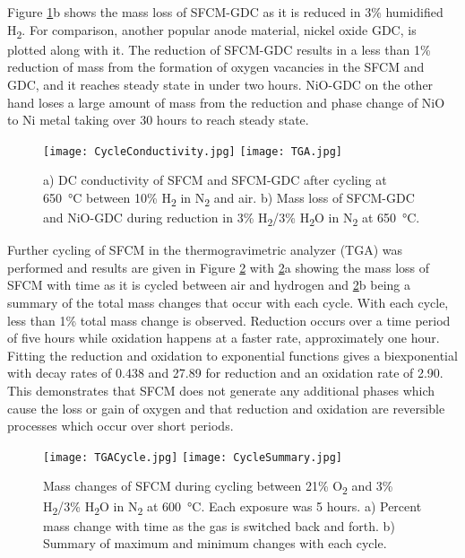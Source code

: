         Figure \ref{fig:TGA}b shows the mass loss of SFCM-GDC as it is reduced in 3\% humidified H\textsubscript{2}.
        For comparison, another popular anode material, nickel oxide GDC, is plotted along with it.
        The reduction of SFCM-GDC results in a less than 1\% reduction of mass from the formation of oxygen vacancies in the SFCM and GDC, and it reaches steady state in under two hours.
        NiO-GDC on the other hand loses a large amount of mass from the reduction and phase change of NiO to Ni metal taking over 30 hours to reach steady state.

        \begin{figure}
          \texttt{[image: CycleConductivity.jpg]}
          \texttt{[image: TGA.jpg]}
          \caption{a) DC conductivity of SFCM and SFCM-GDC after cycling at \SI{650}{\celsius} between 10\% H\textsubscript{2} in N\textsubscript{2} and air. b) Mass loss of SFCM-GDC and NiO-GDC during reduction in 3\% H\textsubscript{2}/3\% H\textsubscript{2}O in N\textsubscript{2} at \SI{650}{\celsius}.}
          \label{fig:TGA}
        \end{figure}

        Further cycling of SFCM in the thermogravimetric analyzer (TGA) was performed and results are given in Figure \ref{fig:Cycled} with \ref{fig:Cycled}a showing the mass loss of SFCM with time as it is cycled between air and hydrogen and \ref{fig:Cycled}b being a summary of the total mass changes that occur with each cycle.
        With each cycle, less than 1\% total mass change is observed.
        Reduction occurs over a time period of five hours while oxidation happens at a faster rate, approximately one hour.
        Fitting the reduction and oxidation to exponential functions gives a biexponential with decay rates of 0.438 and 27.89 for reduction and an oxidation rate of 2.90.
        This demonstrates that SFCM does not generate any additional phases which cause the loss or gain of oxygen and that reduction and oxidation are reversible processes which occur over short periods.

        \begin{figure}
          \texttt{[image: TGACycle.jpg]}
          \texttt{[image: CycleSummary.jpg]}
          \caption{Mass changes of SFCM during cycling between 21\% O\textsubscript{2} and 3\% H\textsubscript{2}/3\% H\textsubscript{2}O in N\textsubscript{2} at \SI{600}{\celsius}. Each exposure was 5 hours. a) Percent mass change with time as the gas is switched back and forth. b) Summary of maximum and minimum changes with each cycle.}
          \label{fig:Cycled}
        \end{figure}

